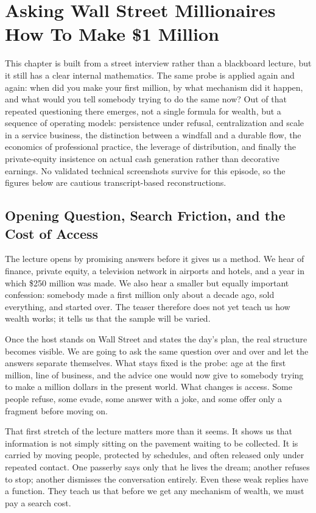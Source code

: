 \chapter{Asking Wall Street Millionaires How To Make \$1 Million}

This chapter is built from a street interview rather than a blackboard lecture, but it still has a clear internal mathematics. The same probe is applied again and again: when did you make your first million, by what mechanism did it happen, and what would you tell somebody trying to do the same now? Out of that repeated questioning there emerges, not a single formula for wealth, but a sequence of operating models: persistence under refusal, centralization and scale in a service business, the distinction between a windfall and a durable flow, the economics of professional practice, the leverage of distribution, and finally the private-equity insistence on actual cash generation rather than decorative earnings. No validated technical screenshots survive for this episode, so the figures below are cautious transcript-based reconstructions.

\section{Opening Question, Search Friction, and the Cost of Access}

The lecture opens by promising answers before it gives us a method. We hear of finance, private equity, a television network in airports and hotels, and a year in which \$250 million was made. We also hear a smaller but equally important confession: somebody made a first million only about a decade ago, sold everything, and started over. The teaser therefore does not yet teach us how wealth works; it tells us that the sample will be varied.

Once the host stands on Wall Street and states the day's plan, the real structure becomes visible. We are going to ask the same question over and over and let the answers separate themselves. What stays fixed is the probe: age at the first million, line of business, and the advice one would now give to somebody trying to make a million dollars in the present world. What changes is access. Some people refuse, some evade, some answer with a joke, and some offer only a fragment before moving on.

That first stretch of the lecture matters more than it seems. It shows us that information is not simply sitting on the pavement waiting to be collected. It is carried by moving people, protected by schedules, and often released only under repeated contact. One passerby says only that he lives the dream; another refuses to stop; another dismisses the conversation entirely. Even these weak replies have a function. They teach us that before we get any mechanism of wealth, we must pay a search cost.

